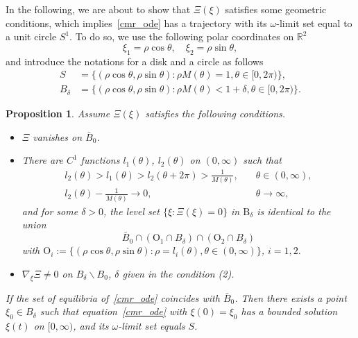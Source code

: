 \documentclass{elsarticle}
\newtheorem{proposition}{Proposition}[section]
\begin{document}
In the following, we are about to show that $\Xi(\xi)$ satisfies some geometric conditions, which implies~\eqref{cmr_ode} has a trajectory with its $\omega$-limit set equal to a unit circle $S^1$. To do so, we use the following polar coordinates on $\mathbb{R}^2$
\[
	\xi_1 = \rho\cos\theta, \quad \xi_2 = \rho\sin\theta,
\]
and introduce the notations for a disk and a circle as follows
\begin{equation*}
\begin{split}
	S &= \{(\rho\cos\theta, \rho\sin\theta): \rho M(\theta) =1, \theta\in[0, 2\pi)\},\\
	B_{\delta} &= \{(\rho\cos\theta, \rho\sin\theta): \rho M(\theta) < 1+\delta, \theta\in[0, 2\pi)\}.
\end{split}
\end{equation*}
\begin{proposition}\label{ode_nonconvergence}
Assume $\Xi(\xi)$ satisfies the following conditions.
\begin{itemize}
\item[{\rm{(1)}}] $\Xi$ vanishes on $\bar{B}_0$.
\item[{\rm{(2)}}] There are $C^1$ functions $l_1(\theta)$, $l_2(\theta)$ on $(0, \infty)$ such that 
\begin{equation*}
\begin{split}
	l_2(\theta) > l_1(\theta) > l_2(\theta + 2\pi) > \frac{1}{M(\theta)}, \quad &\theta\in(0, \infty),\\
	l_2(\theta) - \frac{1}{M(\theta)}\rightarrow 0, \quad &\theta\rightarrow\infty,
\end{split}
\end{equation*}
and for some $\delta > 0$, the level set $\{\xi: \Xi(\xi) = 0\}$ in $\mathrm{B}_{\delta}$ is identical to the union
\[
	\bar{B}_0\cap\left(\mathrm{O}_1\cap B_{\delta} \right)\cap\left(\mathrm{O}_2\cap B_{\delta} \right)
\]
with $\mathrm{O}_i := \{(\rho\cos\theta, \rho\sin\theta): \rho  = l_i(\theta), \theta\in (0, \infty)\}$, $i=1,2.$
\item[{\rm{(3)}}] $\nabla_{\xi}\Xi \neq 0$ on $B_{\delta}\backslash B_{0}$, $\delta$ given in the condition {\rm{(2)}}.
\end{itemize}
If the set of equilibria of~\eqref{cmr_ode} coincides with $\bar{B}_0$. Then there exists a point $\xi_0\in B_{\delta}$ such that equation~\eqref{cmr_ode} with $\xi(0)=\xi_0$ has a bounded solution $\xi(t)$ on $[0, \infty)$, and its $\omega$-limit set equals $S$.
\end{proposition}
\end{document}
